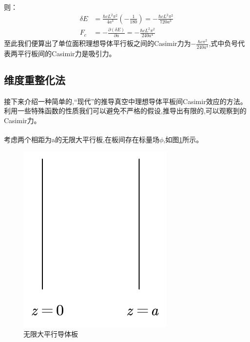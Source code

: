 则：
\begin{equation*}
\begin{split}
\delta E &=\frac{\hbar cL^2\pi ^2}{4a^3}\left( -\frac{1}{180} \right) =-\frac{\hbar cL^2\pi ^2}{720a^3}\\ 
F_c&=-\frac{\partial \left( \delta E \right)}{\partial a}=-\frac{\hbar cL^2\pi ^2}{240a^4}
\end{split}
\end{equation*}
至此我们便算出了单位面积理想导体平行板之间的Casimir力为$-\frac{\hbar c\pi ^2}{240a^4}$,式中负号代表两平行板间的Casimir力是吸引力。



\subsection{维度重整化法}
\paragraph*{}
接下来介绍一种简单的,“现代”的推导真空中理想导体平板间Casimir效应的方法\cite{Milton_2001}。利用一些特殊函数的性质我们可以避免不严格的假设,推导出有限的,可以观察到的Casimir力。
\paragraph*{}
考虑两个相距为a的无限大平行板,在板间存在标量场$\phi$,如图\ref{fig:2}所示。
\begin{figure}[h]
	\centering
	\includegraphics[scale=0.6]{figures/无限大平行板}
	\caption{无限大平行导体板}
	\label{fig:2}
\end{figure}
